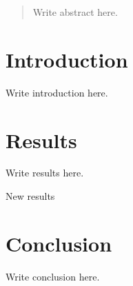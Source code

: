 \documentclass{article}
\begin{document}
\begin{abstract}
Write abstract here.
\end{abstract}

\section{Introduction}

Write introduction here.

\section{Results}

Write results here.

New results

\section{Conclusion}

Write conclusion here.
\end{document}
